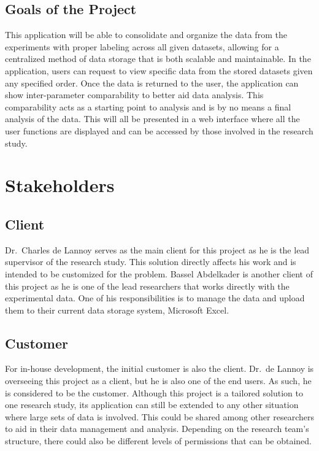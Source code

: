 \documentclass[12pt]{article}
\begin{document}
\subsection{Goals of the Project}
This application will be able to consolidate and organize the data from the
experiments with proper labeling across all given datasets, allowing for a
centralized method of data storage that is both scalable and maintainable. In the
application, users can request to view specific data from the stored datasets
given any specified order. Once the data is returned to the user, the
application can show inter-parameter comparability to better aid data analysis.
This comparability acts as a starting point to analysis and is by no means a
final analysis of the data. This will all be presented in a web interface
where all the user functions are displayed and can be accessed by those
involved in the research study.
\section{Stakeholders}

\subsection{Client}
Dr.\ Charles de Lannoy serves as the main client for this project as he is the
lead supervisor of the research study. This solution directly affects his work and
is intended to be customized for the problem. Bassel Abdelkader is
another client of this project as he is one of the lead researchers that works
directly with the experimental data. One of his responsibilities is to manage
the data and upload them to their current data storage system, Microsoft Excel.
\subsection{Customer} \label{sec:customer}
For in-house development, the initial customer is also the client. Dr.\ de
Lannoy is overseeing this project as a client, but he is also one of the end
users. As such, he is considered to be the customer.\newline 
Although this project is a tailored solution to one research study, its
application can still be extended to any other situation where large sets of
data is involved. This could be shared among other researchers to aid in their
data management and analysis. Depending on the research team's structure, there
could also be different levels of permissions that can be obtained.
\end{document}
